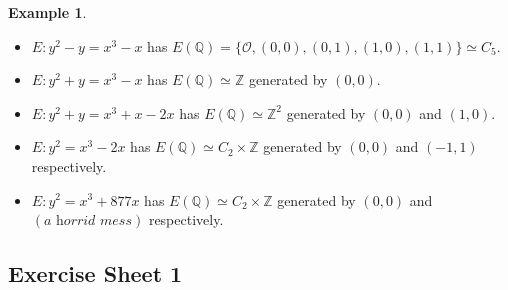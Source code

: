 \documentclass[a4paper]{article}
\theoremstyle{definition}
\newtheorem*{example}{Example}
\renewcommand{\O}{\mathcal{O}}
\newcommand{\Z}{\mathbb{Z}}
\newcommand{\Q}{\mathbb{Q}}
\begin{document}
\begin{example}
    ~
    \begin{itemize}
        \item $E:y^2-y=x^3-x$ has
            $E(\Q)=\{\O,(0,0),(0,1),(1,0),(1,1)\}\simeq C_5$.

        \item $E:y^2+y=x^3-x$ has $E(\Q)\simeq\Z$ generated by $(0,0)$.

        \item $E:y^2+y=x^3+x-2x$ has $E(\Q)\simeq\Z^2$ generated by $(0,0)$ and
            $(1,0)$.

        \item $E:y^2=x^3-2x$ has $E(\Q)\simeq C_2\times\Z$ generated by $(0,0)$
            and $(-1,1)$ respectively.

        \item $E:y^2=x^3+877x$ has $E(\Q)\simeq C_2\times\Z$ generated by $(0,0)$
            and $(\textit{a horrid mess})$ respectively.
    \end{itemize}
\end{example}

\subsection*{Exercise Sheet 1}
\end{document}
